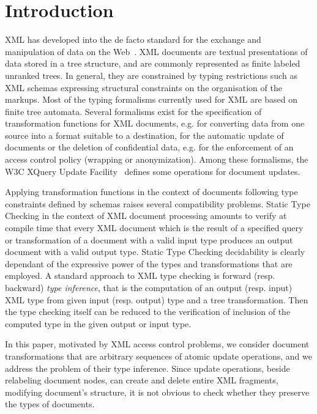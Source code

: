 \documentclass[a4paper]{article}
\newcommand{\remarque}[1]{}
\theoremstyle{plain}
\begin{document}
\makeRR


\section{Introduction}
XML has developed into the {de facto} standard for the exchange and manipulation
of data on the Web~\cite{AbiteboulBunemanSuciu}. 
XML documents are textual presentations of data stored in a tree structure, 
and are commonly represented as finite labeled unranked trees. 
In general, they are constrained by 
typing restrictions such as XML schemas expressing 
structural constraints on the organisation of the markups. 
Most of the typing formalisms currently used for XML are based on
finite tree automata. 
Several formalisms exist for the specification of transformation functions for XML documents,
e.g. for converting data from one source into a format suitable to a destination, 
for the automatic update of documents or 
the deletion of confidential data, e.g. for the enforcement of an access control policy
(wrapping or anonymization).
Among these formalisms, the W3C XQuery Update Facility~\cite{xqupdate}
defines some operations for document updates.

Applying transformation functions in the context of documents
following type constraints defined by schemas raises several compatibility problems.
Static Type Checking in the context of XML document processing amounts to verify at compile time 
that every XML document which is the result of a specified query or transformation 
of a  document with a valid input type produces an output document with a valid output type. 
Static Type Checking decidability is clearly dependant of the expressive power 
of the types and transformations that are employed. 
A standard approach to  XML type checking is 
forward (resp. backward) \emph{type inference}, 
that is the computation of 
an output (resp. input) XML type from given
input (resp. output) type and a tree transformation. 
Then the type checking itself 
can be reduced to  the verification of inclusion of the computed type in the given 
output or input type.

In this paper, motivated by XML access control problems, we consider document transformations that 
are arbitrary sequences of atomic update operations, and we address the problem of their type inference.
Since update operations, beside relabeling document nodes, \remarque{"updating XML content" = relabeling?}
can create and delete entire XML fragments,
modifying document's structure, 
it is not obvious to check whether they preserve the types of documents.
\end{document}
